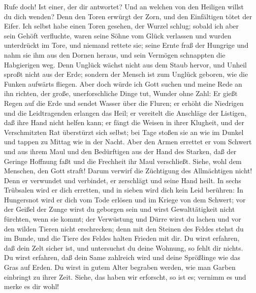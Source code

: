  Rufe doch! Ist einer, der dir antwortet? Und an welchen
von den Heiligen willst du dich wenden?  Denn den Toren
erwürgt der Zorn, und den Einfältigen tötet der Eifer. 
Ich selbst habe einen Toren gesehen, der Wurzel schlug; sobald ich aber
sein Gehöft verfluchte,  waren seine Söhne vom Glück
verlassen und wurden unterdrückt im Tore, und niemand rettete sie;
 seine Ernte fraß der Hungrige und nahm sie ihm aus den
Dornen heraus, und sein Vermögen schnappten die Habgierigen weg.
 Denn Unglück wächst nicht aus dem Staub hervor, und
Unheil sproßt nicht aus der Erde;  sondern der Mensch ist
zum Unglück geboren, wie die Funken aufwärts fliegen. 
Aber doch würde ich Gott suchen und meine Rede an ihn richten,
 der große, unerforschliche Dinge tut, Wunder ohne Zahl:
 Er gießt Regen auf die Erde und sendet Wasser über die
Fluren;  er erhöht die Niedrigen und die Leidtragenden
erlangen das Heil;  er vereitelt die Anschläge der
Listigen, daß ihre Hand nicht helfen kann;  er fängt die
Weisen in ihrer Klugheit, und der Verschmitzten Rat überstürzt sich
selbst;  bei Tage stoßen sie an wie im Dunkel und tappen
zu Mittag wie in der Nacht.  Aber den Armen errettet er
vom Schwert und aus ihrem Maul und den Bedürftigen aus der Hand des
Starken,  daß der Geringe Hoffnung faßt und die Frechheit
ihr Maul verschließt.  Siehe, wohl dem Menschen, den Gott
straft! Darum verwirf die Züchtigung des Allmächtigen nicht!
 Denn er verwundet und verbindet, er zerschlägt und seine
Hand heilt.  In sechs Trübsalen wird er dich erretten,
und in sieben wird dich kein Leid berühren:  In
Hungersnot wird er dich vom Tode erlösen und im Kriege von dem Schwert;
 vor der Geißel der Zunge wirst du geborgen sein und
wirst Gewalttätigkeit nicht fürchten, wenn sie kommt; 
der Verwüstung und Dürre wirst du lachen und vor den wilden Tieren nicht
erschrecken;  denn mit den Steinen des Feldes stehst du
im Bunde, und die Tiere des Feldes halten Frieden mit dir.
 Du wirst erfahren, daß dein Zelt sicher ist, und
untersuchst du deine Wohnung, so fehlt dir nichts.  Du
wirst erfahren, daß dein Same zahlreich wird und deine Sprößlinge wie
das Gras auf Erden.  Du wirst in gutem Alter begraben
werden, wie man Garben einbringt zu ihrer Zeit.  Siehe,
das haben wir erforscht, so ist es; vernimm es und merke es dir wohl!

